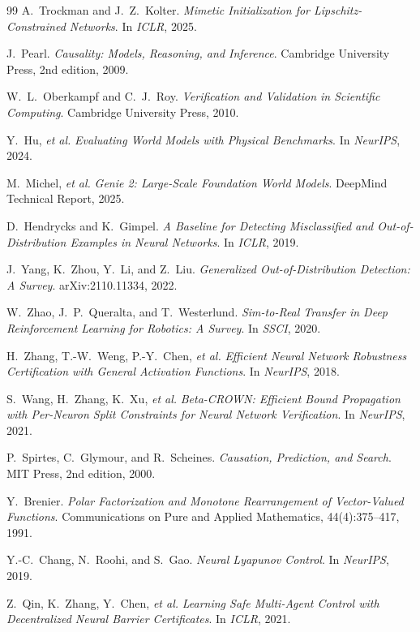 \documentclass[11pt,twocolumn]{article}
\theoremstyle{definition}
\begin{document}
\begin{thebibliography}{99}
A.~Trockman and J.~Z.~Kolter.
\emph{Mimetic Initialization for Lipschitz-Constrained Networks}.
In \emph{ICLR}, 2025.

J.~Pearl.
\emph{Causality: Models, Reasoning, and Inference}.
Cambridge University Press, 2nd edition, 2009.

W.~L.~Oberkampf and C.~J.~Roy.
\emph{Verification and Validation in Scientific Computing}.
Cambridge University Press, 2010.

Y.~Hu, \emph{et al.}
\emph{Evaluating World Models with Physical Benchmarks}.
In \emph{NeurIPS}, 2024.

M.~Michel, \emph{et al.}
\emph{Genie 2: Large-Scale Foundation World Models}.
DeepMind Technical Report, 2025.

D.~Hendrycks and K.~Gimpel.
\emph{A Baseline for Detecting Misclassified and Out-of-Distribution
Examples in Neural Networks}.
In \emph{ICLR}, 2019.

J.~Yang, K.~Zhou, Y.~Li, and Z.~Liu.
\emph{Generalized Out-of-Distribution Detection: A Survey}.
arXiv:2110.11334, 2022.

W.~Zhao, J.~P.~Queralta, and T.~Westerlund.
\emph{Sim-to-Real Transfer in Deep Reinforcement Learning for Robotics:
A Survey}.
In \emph{SSCI}, 2020.

H.~Zhang, T.-W.~Weng, P.-Y.~Chen, \emph{et al.}
\emph{Efficient Neural Network Robustness Certification with General
Activation Functions}.
In \emph{NeurIPS}, 2018.

S.~Wang, H.~Zhang, K.~Xu, \emph{et al.}
\emph{Beta-CROWN: Efficient Bound Propagation with Per-Neuron Split
Constraints for Neural Network Verification}.
In \emph{NeurIPS}, 2021.

P.~Spirtes, C.~Glymour, and R.~Scheines.
\emph{Causation, Prediction, and Search}.
MIT Press, 2nd edition, 2000.

Y.~Brenier.
\emph{Polar Factorization and Monotone Rearrangement of Vector-Valued
Functions}.
Communications on Pure and Applied Mathematics, 44(4):375--417, 1991.

Y.-C.~Chang, N.~Roohi, and S.~Gao.
\emph{Neural Lyapunov Control}.
In \emph{NeurIPS}, 2019.

Z.~Qin, K.~Zhang, Y.~Chen, \emph{et al.}
\emph{Learning Safe Multi-Agent Control with Decentralized Neural Barrier
Certificates}.
In \emph{ICLR}, 2021.


\end{thebibliography}
\end{document}

